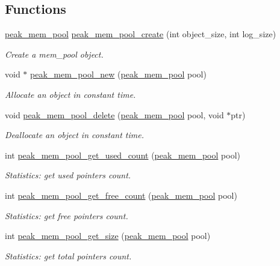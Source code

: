 \subsection*{Functions}
\begin{CompactItemize}
\item 
\hyperlink{group__mem__pool_ga0}{peak\_\-mem\_\-pool} \hyperlink{group__mem__pool_ga1}{peak\_\-mem\_\-pool\_\-create} (int object\_\-size, int log\_\-size)
\begin{CompactList}\small\item\em Create a mem\_\-pool object. \item\end{CompactList}\item 
void $\ast$ \hyperlink{group__mem__pool_ga2}{peak\_\-mem\_\-pool\_\-new} (\hyperlink{group__mem__pool_ga0}{peak\_\-mem\_\-pool} pool)
\begin{CompactList}\small\item\em Allocate an object in constant time. \item\end{CompactList}\item 
void \hyperlink{group__mem__pool_ga3}{peak\_\-mem\_\-pool\_\-delete} (\hyperlink{group__mem__pool_ga0}{peak\_\-mem\_\-pool} pool, void $\ast$ptr)
\begin{CompactList}\small\item\em Deallocate an object in constant time. \item\end{CompactList}\item 
int \hyperlink{group__mem__pool_ga4}{peak\_\-mem\_\-pool\_\-get\_\-used\_\-count} (\hyperlink{group__mem__pool_ga0}{peak\_\-mem\_\-pool} pool)
\begin{CompactList}\small\item\em Statistics: get used pointers count. \item\end{CompactList}\item 
int \hyperlink{group__mem__pool_ga5}{peak\_\-mem\_\-pool\_\-get\_\-free\_\-count} (\hyperlink{group__mem__pool_ga0}{peak\_\-mem\_\-pool} pool)
\begin{CompactList}\small\item\em Statistics: get free pointers count. \item\end{CompactList}\item 
int \hyperlink{group__mem__pool_ga6}{peak\_\-mem\_\-pool\_\-get\_\-size} (\hyperlink{group__mem__pool_ga0}{peak\_\-mem\_\-pool} pool)
\begin{CompactList}\small\item\em Statistics: get total pointers count. \item\end{CompactList}\end{CompactItemize}


